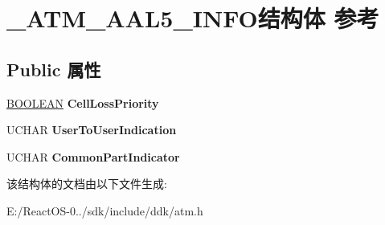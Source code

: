\hypertarget{struct___a_t_m___a_a_l5___i_n_f_o}{}\section{\+\_\+\+A\+T\+M\+\_\+\+A\+A\+L5\+\_\+\+I\+N\+F\+O结构体 参考}
\label{struct___a_t_m___a_a_l5___i_n_f_o}
\subsection*{Public 属性}
\begin{DoxyCompactItemize}
\item 
\mbox{\label{struct___a_t_m___a_a_l5___i_n_f_o_a02f8fdd2eefc194f7bb8f6d89692a2c7}} 
\hyperlink{_processor_bind_8h_a112e3146cb38b6ee95e64d85842e380a}{B\+O\+O\+L\+E\+AN} {\bfseries Cell\+Loss\+Priority}
\item 
\mbox{\label{struct___a_t_m___a_a_l5___i_n_f_o_add8e8ffd577993148c4755a164858551}} 
U\+C\+H\+AR {\bfseries User\+To\+User\+Indication}
\item 
\mbox{\label{struct___a_t_m___a_a_l5___i_n_f_o_a0532050b544709391ccf6c4485b008ed}} 
U\+C\+H\+AR {\bfseries Common\+Part\+Indicator}
\end{DoxyCompactItemize}


该结构体的文档由以下文件生成\+:\begin{DoxyCompactItemize}
\item 
E\+:/\+React\+O\+S-\/0../sdk/include/ddk/atm.\+h\end{DoxyCompactItemize}
